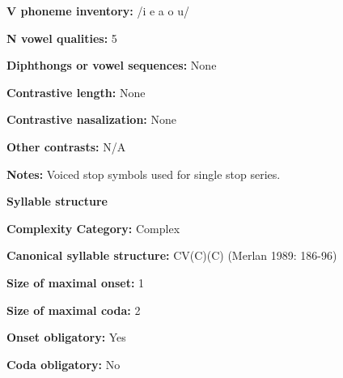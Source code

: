 \begin{styleBody}
\textbf{V phoneme inventory:} /i e a o u/
\end{styleBody}

\begin{styleBody}
\textbf{N vowel qualities:} 5
\end{styleBody}

\begin{styleBody}
\textbf{Diphthongs or vowel sequences:} None
\end{styleBody}

\begin{styleBody}
\textbf{Contrastive length:} None
\end{styleBody}

\begin{styleBody}
\textbf{Contrastive nasalization:} None
\end{styleBody}

\begin{styleBody}
\textbf{Other contrasts:} N/A
\end{styleBody}

\begin{styleBody}
\textbf{Notes:} Voiced stop symbols used for single stop series.
\end{styleBody}

\begin{styleBody}
\textbf{Syllable structure}
\end{styleBody}

\begin{styleBody}
\textbf{Complexity Category:} Complex
\end{styleBody}

\begin{styleBody}
\textbf{Canonical syllable structure:} CV(C)(C)\textbf{ }(Merlan 1989: 186-96)
\end{styleBody}

\begin{styleBody}
\textbf{Size of maximal onset:} 1
\end{styleBody}

\begin{styleBody}
\textbf{Size of maximal coda:} 2
\end{styleBody}

\begin{styleBody}
\textbf{Onset obligatory:} Yes
\end{styleBody}

\begin{styleBody}
\textbf{Coda obligatory:} No
\end{styleBody}

